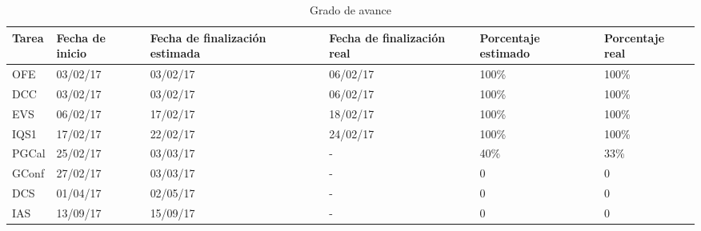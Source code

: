 \begin{table}[h]
\begin{center}
\begin{tabular}{ p{2cm} p{2cm} p{2cm} p{2cm} p{2cm} p{2cm}}

	Tarea & Fecha de inicio & Fecha de finalización estimada & Fecha de finalización real & Porcentaje estimado & Porcentaje real \\ \hline \hline
	OFE & 03/02/17 & 03/02/17 & 06/02/17 & 100\% & 100\% \\ \hline
	DCC & 03/02/17 & 03/02/17 & 06/02/17 & 100\% & 100\% \\ \hline
	EVS & 06/02/17 & 17/02/17 & 18/02/17 & 100\% & 100\% \\ \hline
	IQS1 & 17/02/17 &  22/02/17 & 24/02/17 & 100\% & 100\% \\ \hline
	PGCal & 25/02/17 & 03/03/17 & - & 40\% & 33\% \\ \hline
	GConf & 27/02/17 & 03/03/17 & - & 0 & 0 \\ \hline
	DCS & 01/04/17 & 02/05/17 & - & 0 & 0 \\ \hline
	IAS & 13/09/17 & 15/09/17 & - & 0 & 0 \\ \hline
\end{tabular}
\caption{Grado de avance}
\label{tab:Grado de avance}
\end{center}
\end{table}

\newpage
